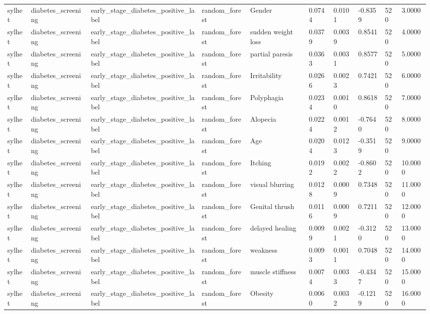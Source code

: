 \begin{tabular}{llllllllll}
sylhet & diabetes\_screening & early\_stage\_diabetes\_positive\_label & random\_forest & Gender & 0.0744 & 0.0101 & -0.8359 & 520 & 3.0000 \\
sylhet & diabetes\_screening & early\_stage\_diabetes\_positive\_label & random\_forest & sudden weight loss & 0.0379 & 0.0039 & 0.8541 & 520 & 4.0000 \\
sylhet & diabetes\_screening & early\_stage\_diabetes\_positive\_label & random\_forest & partial paresis & 0.0363 & 0.0031 & 0.8577 & 520 & 5.0000 \\
sylhet & diabetes\_screening & early\_stage\_diabetes\_positive\_label & random\_forest & Irritability & 0.0266 & 0.0023 & 0.7421 & 520 & 6.0000 \\
sylhet & diabetes\_screening & early\_stage\_diabetes\_positive\_label & random\_forest & Polyphagia & 0.0234 & 0.0010 & 0.8618 & 520 & 7.0000 \\
sylhet & diabetes\_screening & early\_stage\_diabetes\_positive\_label & random\_forest & Alopecia & 0.0224 & 0.0012 & -0.7640 & 520 & 8.0000 \\
sylhet & diabetes\_screening & early\_stage\_diabetes\_positive\_label & random\_forest & Age & 0.0204 & 0.0123 & -0.3519 & 520 & 9.0000 \\
sylhet & diabetes\_screening & early\_stage\_diabetes\_positive\_label & random\_forest & Itching & 0.0192 & 0.0022 & -0.8602 & 520 & 10.0000 \\
sylhet & diabetes\_screening & early\_stage\_diabetes\_positive\_label & random\_forest & visual blurring & 0.0128 & 0.0009 & 0.7348 & 520 & 11.0000 \\
sylhet & diabetes\_screening & early\_stage\_diabetes\_positive\_label & random\_forest & Genital thrush & 0.0116 & 0.0009 & 0.7211 & 520 & 12.0000 \\
sylhet & diabetes\_screening & early\_stage\_diabetes\_positive\_label & random\_forest & delayed healing & 0.0099 & 0.0021 & -0.3120 & 520 & 13.0000 \\
sylhet & diabetes\_screening & early\_stage\_diabetes\_positive\_label & random\_forest & weakness & 0.0093 & 0.0011 & 0.7048 & 520 & 14.0000 \\
sylhet & diabetes\_screening & early\_stage\_diabetes\_positive\_label & random\_forest & muscle stiffness & 0.0074 & 0.0033 & -0.4347 & 520 & 15.0000 \\
sylhet & diabetes\_screening & early\_stage\_diabetes\_positive\_label & random\_forest & Obesity & 0.0060 & 0.0032 & -0.1219 & 520 & 16.0000 \\

\end{tabular}
